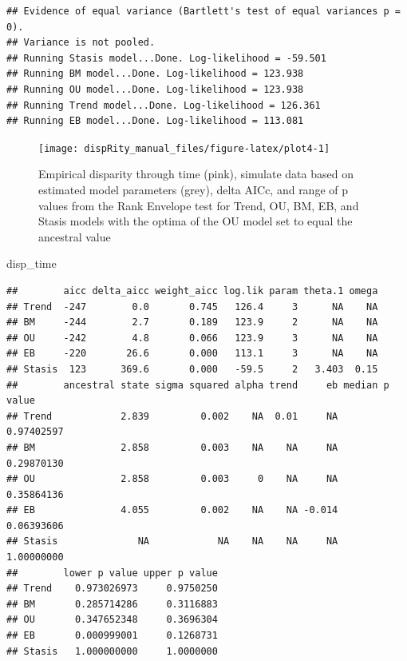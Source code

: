 \documentclass[]{book}
\newenvironment{Shaded}{\begin{snugshade}}{\end{snugshade}}
\newcommand{\NormalTok}[1]{#1}
\theoremstyle{definition}
\theoremstyle{definition}
\theoremstyle{definition}
\theoremstyle{remark}
\begin{document}
\begin{verbatim}
## Evidence of equal variance (Bartlett's test of equal variances p = 0).
## Variance is not pooled.
## Running Stasis model...Done. Log-likelihood = -59.501
## Running BM model...Done. Log-likelihood = 123.938
## Running OU model...Done. Log-likelihood = 123.938
## Running Trend model...Done. Log-likelihood = 126.361
## Running EB model...Done. Log-likelihood = 113.081
\end{verbatim}

\begin{figure}

{\centering \texttt{[image: dispRity\_manual\_files/figure-latex/plot4-1]} 

}

\caption{Empirical disparity through time (pink), simulate data based on estimated model parameters (grey), delta AICc, and range of p values from the Rank Envelope test for Trend, OU, BM, EB, and Stasis models with the optima of the OU model set to equal the ancestral value}\label{fig:plot4}
\end{figure}

\begin{Shaded}
\begin{Highlighting}[]
\NormalTok{disp_time}
\end{Highlighting}
\end{Shaded}

\begin{verbatim}
##        aicc delta_aicc weight_aicc log.lik param theta.1 omega
## Trend  -247        0.0       0.745   126.4     3      NA    NA
## BM     -244        2.7       0.189   123.9     2      NA    NA
## OU     -242        4.8       0.066   123.9     3      NA    NA
## EB     -220       26.6       0.000   113.1     3      NA    NA
## Stasis  123      369.6       0.000   -59.5     2   3.403  0.15
##        ancestral state sigma squared alpha trend     eb median p value
## Trend            2.839         0.002    NA  0.01     NA     0.97402597
## BM               2.858         0.003    NA    NA     NA     0.29870130
## OU               2.858         0.003     0    NA     NA     0.35864136
## EB               4.055         0.002    NA    NA -0.014     0.06393606
## Stasis              NA            NA    NA    NA     NA     1.00000000
##        lower p value upper p value
## Trend    0.973026973     0.9750250
## BM       0.285714286     0.3116883
## OU       0.347652348     0.3696304
## EB       0.000999001     0.1268731
## Stasis   1.000000000     1.0000000
\end{verbatim}
\end{document}
